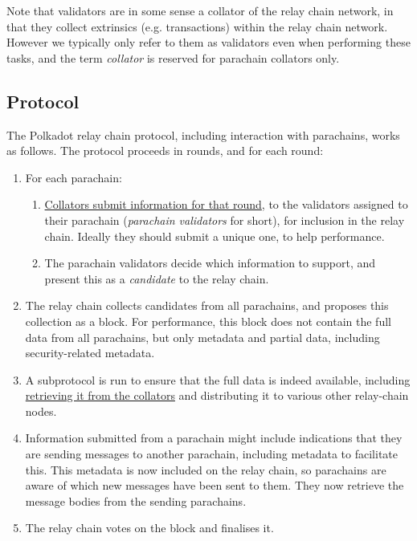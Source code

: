 Note that validators are in some sense a collator of the relay chain network, in that they collect extrinsics (e.g. transactions) within the relay chain network. However we typically only refer to them as validators even when performing these tasks, and the term \emph{collator} is reserved for parachain collators only.

\subsection{Protocol}

The Polkadot relay chain protocol, including interaction with parachains, works as follows. The protocol proceeds in rounds, and for each round:

\begin{enumerate}
\item For each parachain:

  \begin{enumerate}
    \item \uline{Collators submit information for that round}, to the validators assigned to their parachain (\emph{parachain validators} for short), for inclusion in the relay chain. Ideally they should submit a unique one, to help performance.
    \item The parachain validators decide which information to support, and present this as a \emph{candidate} to the relay chain.
  \end{enumerate}
  

\item The relay chain collects candidates from all parachains, and proposes this collection as a block. For performance, this block does not contain the full data from all parachains, but only metadata and partial data, including security-related metadata.

\item A subprotocol is run to ensure that the full data is indeed available, including \uline{retrieving it from the collators} and distributing it to various other relay-chain nodes.



\item Information submitted from a parachain might include indications that they are sending messages to another parachain, including metadata to facilitate this. This metadata is now included on the relay chain, so parachains are aware of which new messages have been sent to them. They now retrieve the message bodies from the sending parachains.

\item The relay chain votes on the block and finalises it. %

\end{enumerate}

